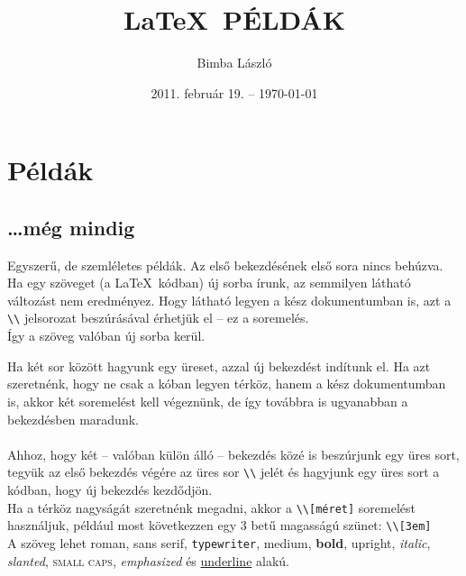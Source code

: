 \documentclass[a4paper]{report}             %
\title{  \LaTeX\ PÉLDÁK }                   %
\author{ Bimba László }                     %
\date{   2011. február 19. -- \today }      %
\begin{document}

\maketitle          %
\tableofcontents    %

\part{Példák}
\chapter{\dots még mindig}

Egyszerű, de szemléletes példák. Az első bekezdésének első sora nincs behúzva.
Ha egy szöveget (a \LaTeX\ kódban) új sorba írunk, az semmilyen látható
változást nem eredményez. Hogy látható legyen a kész dokumentumban is, azt a
\verb"\\" jelsorozat beszúrásával érhetjük el -- ez a soremelés. \\
Így a szöveg valóban új sorba kerül.

Ha két sor között hagyunk egy üreset, azzal új bekezdést indítunk el. Ha azt
szeretnénk, hogy ne csak a kóban legyen térköz, hanem a kész dokumentumban is,
akkor két soremelést kell végeznünk, de így továbbra is ugyanabban a
bekezdésben maradunk. \\
\\
Ahhoz, hogy két -- valóban külön álló -- bekezdés közé is beszúrjunk egy üres
sort, tegyük az első bekezdés végére az üres sor \verb"\\" jelét és hagyjunk
egy üres sort a kódban, hogy új bekezdés kezdődjön.
\\

Ha a térköz nagyságát szeretnénk megadni, akkor a \verb"\\[méret]" soremelést
használjuk, például most következzen egy 3 betű magasságú szünet:
\verb"\\[3em]" \\[3em]

A szöveg lehet \textrm{roman}, \textsf{sans serif}, \texttt{typewriter},
\textmd{medium}, \textbf{bold}, \textup{upright}, \textit{italic},
\textsl{slanted}, \textsc{small caps}, \emph{emphasized} és
\underline{underline} alakú.
\\
\end{document}
